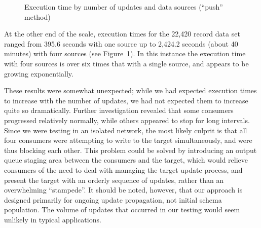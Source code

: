 \documentclass{CRPITStyle}
\begin{document}
\begin{figure}
	\caption{Execution time by number of updates and data sources (``push'' method)}
	\label{fig-run-times}
\end{figure}


At the other end of the scale, execution times for the 22,420 record
data set ranged from 395.6 seconds with one source up to 2,424.2 seconds
(about 40 minutes) with four sources (see Figure~\ref{fig-run-times}).
In this instance the execution time with four sources is over six times
that with a single source, and appears to be growing exponentially.

These results were somewhat unexpected; while we had expected execution
times to increase with the number of updates, we had not expected them
to increase quite so dramatically. Further investigation revealed that
some consumers progressed relatively normally, while others appeared to
stop for long intervals. Since we were testing in an isolated network,
the most likely culprit is that all four consumers were attempting to
write to the target simultaneously, and were thus blocking each other.
This problem could be solved by introducing an output queue staging area
between the consumers and the target, which would relieve consumers of
the need to deal with managing the target update process, and present
the target with an orderly sequence of updates, rather than an
overwhelming ``stampede''. It should be noted, however, that our
approach is designed primarily for ongoing update propagation, not
initial schema population. The volume of updates that occurred in our
testing would seem unlikely in typical applications.
\end{document}
